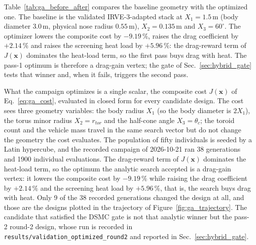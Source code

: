 Table~\ref{tab:ga_before_after} compares the baseline geometry with the optimized one. The baseline is the validated IRVE-3-adapted stack at $X_1 = 1.5$\,m (body diameter $3.0$\,m, physical nose radius $0.55$\,m), $X_2 = 0.135$\,m and $X_3 = 60^\circ$. The optimizer lowers the composite cost by $-9.19\,\%$, raises the drag coefficient by $+2.14\,\%$ and raises the screening heat load by $+5.96\,\%$: the drag-reward term of $J(\mathbf{x})$ dominates the heat-load term, so the first pass buys drag with heat. The pass-1 optimum is therefore a drag-gain vertex; the gate of Sec.~\ref{sec:hybrid_gate} tests that winner and, when it fails, triggers the second pass.

What the campaign optimizes is a single scalar, the composite cost $J(\mathbf{x})$ of Eq.~\eqref{eq:ga_cost}, evaluated in closed form for every candidate design. The cost sees three geometry variables: the body radius $X_1$ (so the body diameter is $2X_1$), the torus minor radius $X_2 = r_{tor}$ and the half-cone angle $X_3 = \theta_c$; the toroid count and the vehicle mass travel in the same search vector but do not change the geometry the cost evaluates. The population of fifty individuals is seeded by a Latin hypercube, and the recorded campaign of 2026-10-21 ran 38 generations and 1900 individual evaluations. The drag-reward term of $J(\mathbf{x})$ dominates the heat-load term, so the optimum the analytic search accepted is a drag-gain vertex: it lowers the composite cost by $-9.19\,\%$ while raising the drag coefficient by $+2.14\,\%$ and the screening heat load by $+5.96\,\%$, that is, the search buys drag with heat. Only 9 of the 38 recorded generations changed the design at all, and those are the designs plotted in the trajectory of Figure~\ref{fig:ga_trajectory}. The candidate that satisfied the DSMC gate is not that analytic winner but the pass-2 round-2 design, whose run is recorded in \texttt{results/validation\_optimized\_round2} and reported in Sec.~\ref{sec:hybrid_gate}.


